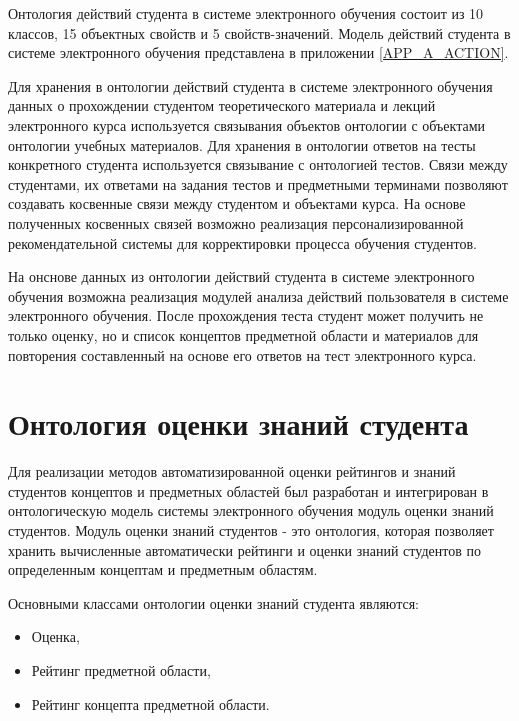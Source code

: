 Онтология действий студента в системе электронного обучения состоит из 10 классов, 15 объектных свойств и 5 свойств-значений. Модель действий студента в системе электронного обучения представлена в приложении \ref{APP_A_ACTION}.

Для хранения в онтологии действий студента в системе электронного обучения данных о прохождении студентом теоретического материала и лекций электронного курса используется связывания объектов онтологии с объектами онтологии учебных материалов. Для хранения в онтологии  ответов на тесты конкретного студента используется связывание с онтологией тестов. Связи между студентами, их ответами на задания тестов и предметными терминами позволяют создавать косвенные связи между студентом и объектами курса. На основе полученных косвенных связей возможно реализация персонализированной рекомендательной системы для корректировки процесса обучения студентов. 

На онснове данных из онтологии действий студента в системе электронного обучения возможна реализация модулей анализа действий пользователя в системе электронного обучения. После прохождения теста студент может получить не только оценку, но и список концептов предметной области и материалов для повторения составленный на основе его ответов на тест электронного курса.





\section{Онтология оценки знаний студента} \label{sect2_5}

Для реализации методов автоматизированной оценки рейтингов и знаний студентов концептов и предметных областей был разработан и интегрирован в онтологическую модель системы электронного обучения модуль оценки знаний студентов. Модуль оценки знаний студентов - это онтология, которая позволяет хранить вычисленные автоматически рейтинги и оценки знаний студентов по определенным концептам и предметным областям. 

Основными классами онтологии оценки знаний студента являются:

\begin{itemize}
\item Оценка,
\item Рейтинг предметной области,
\item Рейтинг концепта предметной области.
\end{itemize}

